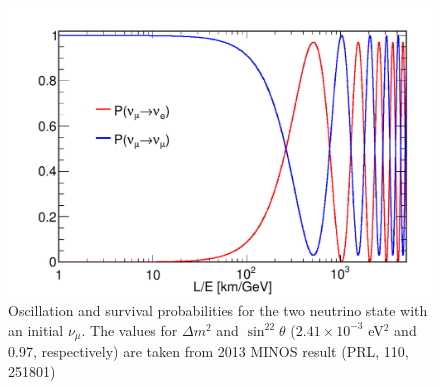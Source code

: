 \documentclass[aps,prd,twocolumn,nofootinbib]{revtex4-1}
\begin{document}
\begin{figure}[H]
  \centering
  \includegraphics[width=1\linewidth]{../figures/oscillation_prob.pdf}
  \caption{Oscillation and survival probabilities for the two neutrino state with an initial $\nu_{\mu}$. The values for $\Delta m^2$ and $\sin^22\theta$ ($2.41\times 10^{-3}$ eV$^2$ and 0.97, respectively) are taken from 2013 MINOS result (PRL, 110, 251801)}
  \label{fig:probs}
\end{figure}
\end{document}
